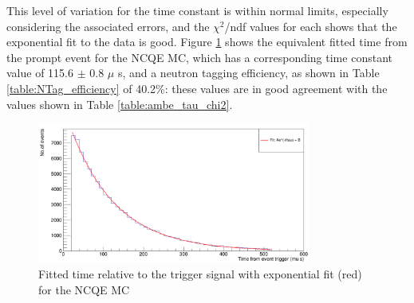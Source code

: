 This level of variation for the time constant is within normal limits, especially considering the associated errors, and the $\chi^{2}$/ndf values for each shows that the exponential fit to the data is good. Figure \ref{fig:MC_time_constant} shows the equivalent fitted time from the prompt event for the NCQE MC, which has a corresponding time constant value of 115.6 $\pm$ 0.8 $\mu$ s, and a neutron tagging efficiency, as shown in Table \ref{table:NTag_efficiency} of 40.2\%: these values are in good agreement with the values shown in Table \ref{table:ambe_tau_chi2}. 

\begin{figure}
    \centering
    \includegraphics[width=0.8\textwidth]{Figures/MC_fitT.png}
    \caption{Fitted time relative to the trigger signal with exponential fit (red) for the NCQE MC}
    \label{fig:MC_time_constant}
\end{figure}

